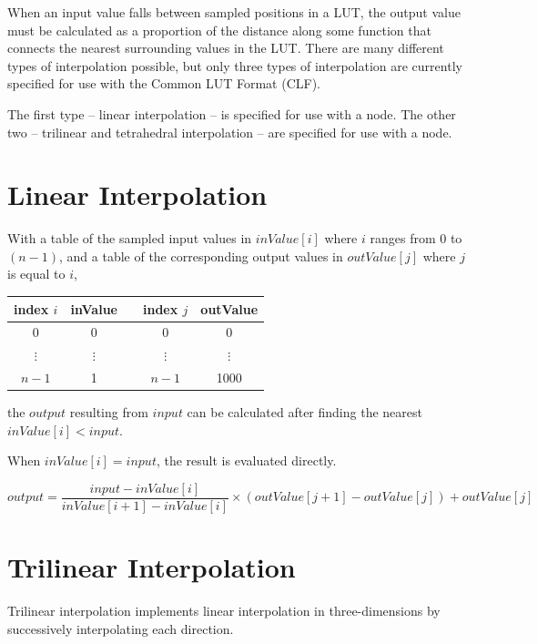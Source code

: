 \label{appendix:interpolation}

When an input value falls between sampled positions in a LUT, the output value must be calculated as a proportion of the distance along some function that connects the nearest surrounding values in the LUT. There are many different types of interpolation possible, but only three types of interpolation are currently specified for use with the Common LUT Format (CLF). 

The first type -- linear interpolation -- is specified for use with a  node. The other two -- trilinear and tetrahedral interpolation -- are specified for use with a  node.

\section{Linear Interpolation}
With a table of the sampled input values in $inValue[i]$ where $i$ ranges from $0$ to $(n-1)$, and a table of the corresponding output values in $outValue[j]$ where $j$ is equal to $i$,

\begin{center}
\begin{tabularx}{3in}{ccXcc}
    index $i$ & inValue && index $j$ & outValue \\ \hline
    0 & 0 && 0 & 0 \\
    $\vdots$ & $\vdots$ && $\vdots$ & $\vdots$ \\
    $n-1$ & 1 && $n-1$ & 1000 \\
\end{tabularx}
\end{center}

the $output$ resulting from $input$ can be calculated after finding the nearest $inValue[i] < input$. 

When $inValue[i] = input$, the result is evaluated directly.

\begin{center}
$output = \dfrac{input-inValue[i]}{inValue[i+1]-inValue[i]} \times (outValue[j+1]-outValue[j])+outValue[j]$ 
\end{center}

\section{Trilinear Interpolation}
Trilinear interpolation implements linear interpolation in three-dimensions by successively interpolating each direction. 

